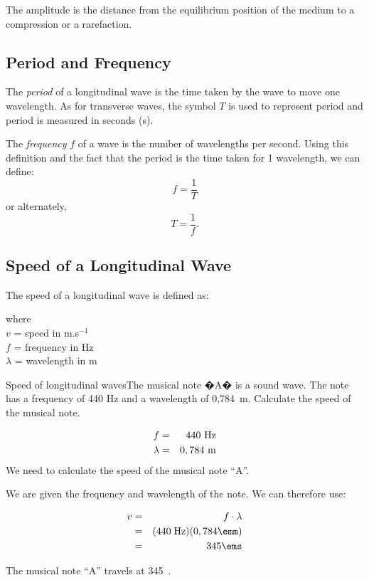 The amplitude is the distance from the equilibrium position of the medium to a compression or a rarefaction.

\subsection{Period and Frequency}



The \emph{period} of a longitudinal wave is the time taken by the wave to move one wavelength. As for transverse waves, the symbol $T$ is used to represent period and period is measured in seconds (s).

The \textit{frequency} $f$ of a wave is the number of wavelengths per second. Using this definition and the fact that the period is the time taken for 1 wavelength, we can define:
\begin{equation*}
f=\frac{1}{T}
\end{equation*}
or alternately,
\begin{equation*}
T=\frac{1}{f}.
\end{equation*}

\subsection{Speed of a Longitudinal Wave}
The speed of a longitudinal wave is defined as:


where \\
$v$ = speed in m.s$^{-1}$\\
$f$ = frequency in Hz\\
$\lambda$ = wavelength in m 

\begin{wex}
{Speed of longitudinal waves}{The musical note �A� is a sound wave. The note has a frequency of 440 Hz and a wavelength of 0,784~m. Calculate the speed of the musical note.}{
\begin{eqnarray*}
f &=& 440 \ \rm{Hz} \\
\lambda &=& 0,784\ \rm{m}
\end{eqnarray*}
We need to calculate the speed of the musical note ``A''.

We are given the frequency and wavelength of the note. We can therefore use:

\begin{eqnarray*}
v&=&f\cdot \lambda\\
&=&(440\;\rm{Hz})(0,784\emm)\\
&=&345\ems
\end{eqnarray*}

The musical note ``A'' travels at 345~\ms.
}
\end{wex}

